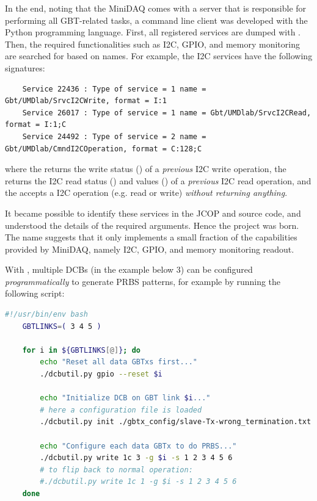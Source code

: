 In the end,
noting that the MiniDAQ comes with a \dim server that is responsible for
performing all GBT-related tasks,
a command line \dim client was developed with the Python programming language.
First, all registered \dim services are dumped with \pydim
\cite{pydim}.
Then, the required functionalities such as I2C, GPIO, and memory
monitoring are searched for based on names.
For example, the I2C services have the following signatures:
\begin{lstlisting}
    Service 22436 : Type of service = 1 name = Gbt/UMDlab/SrvcI2CWrite, format = I:1
    Service 26017 : Type of service = 1 name = Gbt/UMDlab/SrvcI2CRead, format = I:1;C
    Service 24492 : Type of service = 2 name = Gbt/UMDlab/CmndI2COperation, format = C:128;C
\end{lstlisting}
where
the  returns the write status ()
of a \emph{previous} I2C write operation,
the  returns the I2C read status () and values
() of a \emph{previous} I2C read operation,
and the  accepts a I2C operation (e.g. read or write)
\emph{without returning anything}.

It became possible to identify these services in the JCOP and 
source code,
and understood the details of the required arguments.
Hence the \nanoDAQ project \cite{nanoDAQ} was born.
The name suggests that it only implements a small fraction of the capabilities
provided by MiniDAQ, namely I2C, GPIO, and memory monitoring readout.

With \nanoDAQ, multiple DCBs (in the example below 3) can be configured
\emph{programmatically} to generate PRBS patterns,
for example by running the following  script:

\begin{lstlisting}[language=Bash]
    #!/usr/bin/env bash
    GBTLINKS=( 3 4 5 )

    for i in ${GBTLINKS[@]}; do
        echo "Reset all data GBTxs first..."
        ./dcbutil.py gpio --reset $i

        echo "Initialize DCB on GBT link $i..."
        # here a configuration file is loaded
        ./dcbutil.py init ./gbtx_config/slave-Tx-wrong_termination.txt -g $i

        echo "Configure each data GBTx to do PRBS..."
        ./dcbutil.py write 1c 3 -g $i -s 1 2 3 4 5 6
        # to flip back to normal operation:
        #./dcbutil.py write 1c 1 -g $i -s 1 2 3 4 5 6
    done
\end{lstlisting}


